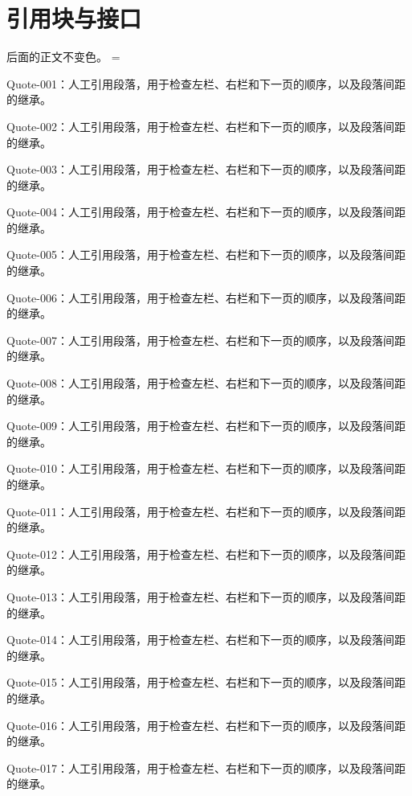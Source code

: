 \documentclass{article}
\begin{document}
\section{引用块与接口}
 后面的正文不变色。
\Separator{}
\vspace*{.6\textheight}
\QuoteParagraphSkip=\parskip
\begin{quoteblock}
\ifdim\parskip=\QuoteParagraphSkip\else
  \PackageError{interfaces-test}{Quote paragraph spacing changed}{Preserve the surrounding paragraph spacing.}%
\fi
Quote-001：人工引用段落，用于检查左栏、右栏和下一页的顺序，以及段落间距的继承。

Quote-002：人工引用段落，用于检查左栏、右栏和下一页的顺序，以及段落间距的继承。

Quote-003：人工引用段落，用于检查左栏、右栏和下一页的顺序，以及段落间距的继承。

Quote-004：人工引用段落，用于检查左栏、右栏和下一页的顺序，以及段落间距的继承。

Quote-005：人工引用段落，用于检查左栏、右栏和下一页的顺序，以及段落间距的继承。

Quote-006：人工引用段落，用于检查左栏、右栏和下一页的顺序，以及段落间距的继承。

Quote-007：人工引用段落，用于检查左栏、右栏和下一页的顺序，以及段落间距的继承。

Quote-008：人工引用段落，用于检查左栏、右栏和下一页的顺序，以及段落间距的继承。

Quote-009：人工引用段落，用于检查左栏、右栏和下一页的顺序，以及段落间距的继承。

Quote-010：人工引用段落，用于检查左栏、右栏和下一页的顺序，以及段落间距的继承。

Quote-011：人工引用段落，用于检查左栏、右栏和下一页的顺序，以及段落间距的继承。

Quote-012：人工引用段落，用于检查左栏、右栏和下一页的顺序，以及段落间距的继承。

Quote-013：人工引用段落，用于检查左栏、右栏和下一页的顺序，以及段落间距的继承。

Quote-014：人工引用段落，用于检查左栏、右栏和下一页的顺序，以及段落间距的继承。

Quote-015：人工引用段落，用于检查左栏、右栏和下一页的顺序，以及段落间距的继承。

Quote-016：人工引用段落，用于检查左栏、右栏和下一页的顺序，以及段落间距的继承。

Quote-017：人工引用段落，用于检查左栏、右栏和下一页的顺序，以及段落间距的继承。


\end{quoteblock}
\end{document}
